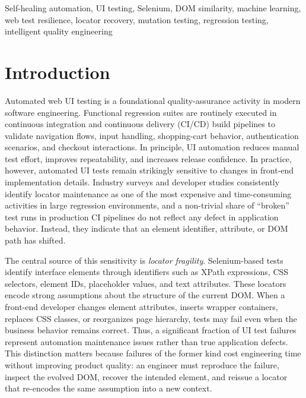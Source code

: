 \documentclass[conference]{IEEEtran}
\begin{document}
\begin{abstract}
potential of intelligent automation frameworks to transform traditional test automation into adaptive testing systems capable of maintaining long-term reliability in rapidly evolving software applications.
\end{abstract}

\begin{IEEEkeywords}
Self-healing automation, UI testing, Selenium, DOM similarity, machine learning, web test resilience, locator recovery, mutation testing, regression testing, intelligent quality engineering
\end{IEEEkeywords}

\section{Introduction}
Automated web UI testing is a foundational quality-assurance activity in modern software engineering. Functional regression suites are routinely executed in continuous integration and continuous delivery (CI/CD) build pipelines to validate navigation flows, input handling, shopping-cart behavior, authentication scenarios, and checkout interactions. In principle, UI automation reduces manual test effort, improves repeatability, and increases release confidence. In practice, however, automated UI tests remain strikingly sensitive to changes in front-end implementation details. Industry surveys and developer studies consistently identify locator maintenance as one of the most expensive and time-consuming activities in large regression environments, and a non-trivial share of ``broken'' test runs in production CI pipelines do not reflect any defect in application behavior. Instead, they indicate that an element identifier, attribute, or DOM path has shifted.

The central source of this sensitivity is \emph{locator fragility}. Selenium-based tests identify interface elements through identifiers such as XPath expressions, CSS selectors, element IDs, placeholder values, and text attributes. These locators encode strong assumptions about the structure of the current DOM. When a front-end developer changes element attributes, inserts wrapper containers, replaces CSS classes, or reorganizes page hierarchy, tests may fail even when the business behavior remains correct. Thus, a significant fraction of UI test failures represent automation maintenance issues rather than true application defects. This distinction matters because failures of the former kind cost engineering time without improving product quality: an engineer must reproduce the failure, inspect the evolved DOM, recover the intended element, and reissue a locator that re-encodes the same assumption into a new context.
\end{document}
